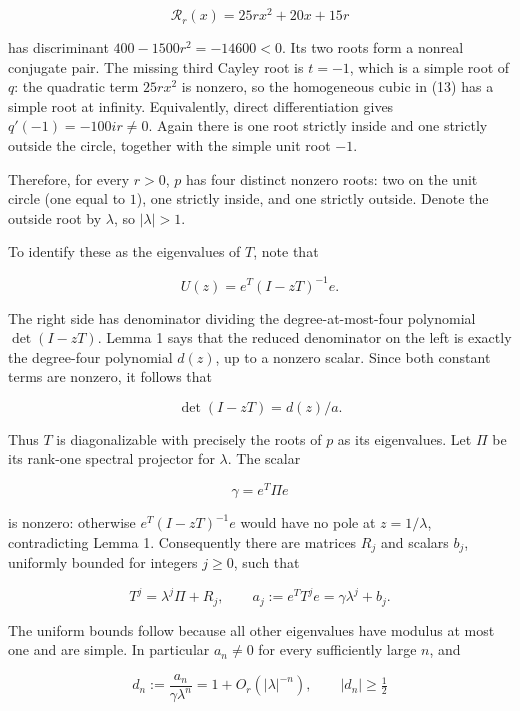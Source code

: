\documentclass[10pt,a4paper]{article}
\begin{document}
\[
\mathcal R_r(x)=25rx^2+20x+15r
\]

has discriminant \(400-1500r^2=-14600<0\). Its two roots form a nonreal
conjugate pair. The missing third Cayley root is \(t=-1\), which is a
simple root of \(q\): the quadratic term \(25rx^2\) is nonzero, so the
homogeneous cubic in (13) has a simple root at infinity. Equivalently,
direct differentiation gives \(q'(-1)=-100ir\ne0\). Again there is one
root strictly inside and one strictly outside the circle, together with
the simple unit root \(-1\).

Therefore, for every \(r>0\), \(p\) has four distinct nonzero roots: two
on the unit circle (one equal to \(1\)), one strictly inside, and one
strictly outside. Denote the outside root by \(\lambda\), so
\(|\lambda|>1\).

To identify these as the eigenvalues of \(T\), note that

\nopagebreak[4]

\[
U(z)=e^T(I-zT)^{-1}e.
\]

The right side has denominator dividing the degree-at-most-four
polynomial \(\det(I-zT)\). Lemma 1 says that the reduced denominator on
the left is exactly the degree-four polynomial \(d(z)\), up to a nonzero
scalar. Since both constant terms are nonzero, it follows that

\nopagebreak[4]

\[
\det(I-zT)=d(z)/a.
\tag{15}
\]

Thus \(T\) is diagonalizable with precisely the roots of \(p\) as its
eigenvalues. Let \(\Pi\) be its rank-one spectral projector for
\(\lambda\). The scalar

\nopagebreak[4]

\[
\gamma=e^T\Pi e
\tag{16}
\]

is nonzero: otherwise \(e^T(I-zT)^{-1}e\) would have no pole at
\(z=1/\lambda\), contradicting Lemma 1. Consequently there are matrices
\(R_j\) and scalars \(b_j\), uniformly bounded for integers \(j\ge0\),
such that

\nopagebreak[4]

\[
T^j=\lambda^j\Pi+R_j,\qquad
 a_j:=e^TT^je=\gamma\lambda^j+b_j.
\tag{17}
\]

The uniform bounds follow because all other eigenvalues have modulus at
most one and are simple. In particular \(a_n\ne0\) for every
sufficiently large \(n\), and

\nopagebreak[4]

\[
d_n:=\frac{a_n}{\gamma\lambda^n}=1+O_r(|\lambda|^{-n}),
\qquad |d_n|\ge\tfrac12
\tag{18}
\]
\end{document}
